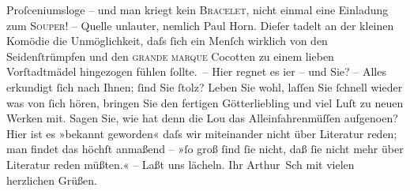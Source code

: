 \begin{ledgroupsized}[t]{13cm}
               Proſceniumsloge – und {\pb}man kriegt kein \textsc{Bracelet}, nicht einmal eine Einladung zum \textsc{Souper}! – Quelle unlauter, nemlich Paul Horn. Dieſer tadelt an der kleinen Komödie die Unmöglichkeit, daſs ſich ein Menſch
               wirklich von den Seidenſtrümpfen und den \textsc{grande marque}
               Cocotten zu einem lieben Vorſtadtmädel hingezogen fühlen ſollte. –\pend
           \pstart
           Hier regnet es i{\geminationm}er – und Sie? – Alles erkundigt ſich
               nach Ihnen; ſind Sie ſtolz? Leben Sie wohl, laſſen Sie ſchnell {\pb}wieder was von ſich hören, bringen Sie den fertigen
                  Götterliebling und viel Luſt
               zu neuen Werken mit. Sagen Sie, wie hat denn die Lou das Alleinfahrenmüſſen aufgeno{\geminationm}en? Hier ist
               es »bekannt geworden« daſs wir miteinander nicht über Literatur reden; man findet das
               höchſt anmaßend – »ſo groß ſind ſie nicht, daß ſie nicht mehr über Literatur reden
               müßten.« – Laßt uns lächeln.\pend
           \pstart Ihr \spacefill\mbox{Arthur Sch} mit vielen herzlichen Grüßen.\pend{}
         
         \endnumbering{}\end{ledgroupsized}  \newcommand{\dateiname}{L00483}\newcommand{\titel}{Arthur Schnitzler an Richard Beer-Hofmann, 15. 9. 1895}\newcommand{\editorInnen}{ Martin Anton Müller und Gerd-Hermann Susen}
      